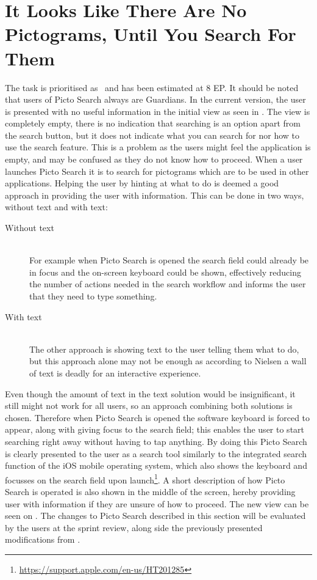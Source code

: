\section{It Looks Like There Are No Pictograms, Until You Search For Them}\label{untilSearch}
\begin{center}
\end{center}

The task is prioritised as \phigh~and has been estimated at 8 EP.  
It should be noted that users of Picto Search always are Guardians.
In the current version, the user is presented with no useful information in the initial view as seen in . 
The view is completely empty, there is no indication that searching is an option apart from the search button, but it does not indicate what you can search for nor how to use the search feature.
This is a problem as the users might feel the application is empty, and may be confused as they do not know how to proceed.
When a user launches Picto Search it is to search for pictograms which are to be used in other applications.
Helping the user by hinting at what to do is deemed a good approach in providing the user with information.
This can be done in two ways, without text and with text:
\begin{description}
    \item [Without text] \hfill\\
    For example when Picto Search is opened the search field could already be in focus and the on-screen keyboard could be shown, effectively reducing the number of actions needed in the search workflow and informs the user that they need to type something.
    \item [With text] \hfill\\
    The other approach is showing text to the user telling them what to do, but this approach alone may not be enough as according to Nielsen \cite{nielsen2003usability} a wall of text is deadly for an interactive experience.
\end{description}

Even though the amount of text in the text solution would be insignificant, it still might not work for all users, so an approach combining both solutions is chosen.
Therefore when Picto Search is opened the software keyboard is forced to appear, along with giving focus to the search field; this enables the user to start searching right away without having to tap anything.
By doing this Picto Search is clearly presented to the user as a search tool similarly to the integrated search function of the iOS mobile operating system, which also shows the keyboard and focusses on the search field upon launch\footnote{\url{https://support.apple.com/en-us/HT201285}}.               
A short description of how Picto Search is operated is also shown in the middle of the screen, hereby providing user with information if they are unsure of how to proceed.
The new view can be seen on .
The changes to Picto Search described in this section will be evaluated by the users at the sprint review, along side the previously presented modifications from .